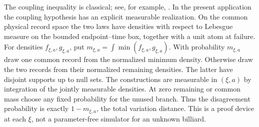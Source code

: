 The coupling inequality is classical; see, for example,
\cite[Proposition 4.7]{LPW}. In the present application the coupling
hypothesis has an explicit measurable realization. On the common physical
record space the two laws have densities with respect to Lebesgue measure
on the bounded endpoint--time box, together with a unit atom at failure.
For densities $f_{\xi,a},g_{\xi,a}$, put
$m_{\xi,a}=\int\min(f_{\xi,a},g_{\xi,a})$.
With probability $m_{\xi,a}$ draw one common record from the normalized
minimum density. Otherwise draw the two records from their normalized
remaining densities. The latter have disjoint supports up to null sets.
The constructions are measurable in $(\xi,a)$ by integration of the
jointly measurable densities. At zero remaining or common mass choose
any fixed probability for the unused branch. Thus the disagreement
probability is exactly $1-m_{\xi,a}$, the total variation distance.
This is a proof device at each $\xi$, not a parameter-free simulator for
an unknown billiard.

